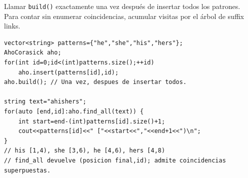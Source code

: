 Llamar \texttt{build()} exactamente una vez despu\'es de insertar todos los
patrones. Para contar sin enumerar coincidencias, acumular visitas por el
\'arbol de suffix links.

\begin{lstlisting}[style=cpp]
vector<string> patterns={"he","she","his","hers"};
AhoCorasick aho;
for(int id=0;id<(int)patterns.size();++id)
    aho.insert(patterns[id],id);
aho.build(); // Una vez, despues de insertar todos.

string text="ahishers";
for(auto [end,id]:aho.find_all(text)) {
    int start=end-(int)patterns[id].size()+1;
    cout<<patterns[id]<<" ["<<start<<","<<end+1<<")\n";
}
// his [1,4), she [3,6), he [4,6), hers [4,8)
// find_all devuelve (posicion final,id); admite coincidencias superpuestas.
\end{lstlisting}
